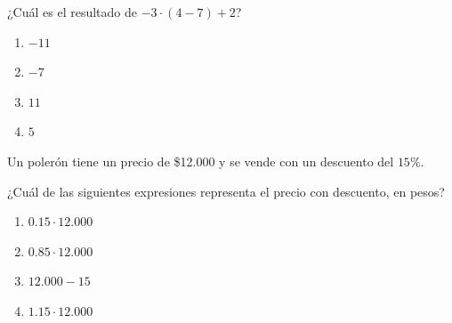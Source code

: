 
    \item ¿Cuál es el resultado de $-3\cdot(4-7)+2$?
    \begin{enumerate}
        \item $-11$
        \item $-7$
        \item $11$ %
        \item $5$
    \end{enumerate}

    \item Un polerón tiene un precio de \$12.000 y se vende con un descuento del $15\%$.

    ¿Cuál de las siguientes expresiones representa el precio con descuento, en pesos?
    \begin{enumerate}
        \item $0.15\cdot 12{.}000$
        \item $0.85\cdot 12{.}000$ %
        \item $12{.}000-15$
        \item $1.15\cdot 12{.}000$
    \end{enumerate}
